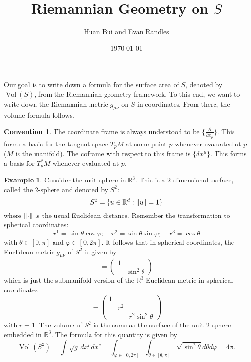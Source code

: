 \documentclass{article}
\author{Huan Bui and Evan Randles}
\title{Riemannian Geometry on $S$}
\date{\today}
\theoremstyle{definition}
\newtheorem{exmp}{Example}[section]
\newcommand{\p}{\partial}
\newcommand{\R}{\mathbb{R}}
\newcommand{\f}[2]{\frac{#1}{#2}}
\theoremstyle{theorem}
\newtheorem{convention}[theorem]{Convention}
\newcommand{\Vol}{\operatorname{Vol}}
\begin{document}
\maketitle

Our goal is to write down a formula for the surface area of $S$, denoted by $\Vol(S)$, from the Riemannian geometry framework. To this end, we want to write down the Riemannian metric $g_{\mu\nu}$ on $S$ in coordinates. From there, the volume formula follows. 



\begin{convention}
The coordinate frame is always understood to be $\{ \f{\p}{\p x_\mu} \}$. This forms a basis for the tangent space $T_pM$ at some point $p$ whenever evaluated at $p$ ($M$ is the manifold). The coframe with respect to this frame is $\{ dx^\mu \}$. This forms a basis for $T_p^*M$ whenever evaluated at $p$. 
\end{convention}











\begin{exmp}
Consider the unit sphere in $\R^3$. This is a 2-dimensional surface, called the 2-sphere and denoted by $S^2$:
\begin{equation*}
    S^2 = \{ u\in \R^d : \norm{u} = 1 \}
\end{equation*}
where $\norm{\cdot}$ is the usual Euclidean distance. Remember the transformation to spherical coordinates:
\begin{equation}
    x^1 = \sin \theta \cos\varphi; \quad x^2 = \sin\theta\sin\varphi; \quad x^3 = \cos\theta
\end{equation}
with $\theta \in [0,\pi]$ and $\varphi \in [0,2\pi]$. It follows that in spherical coordinates, the Euclidean metric $g_{\mu\nu}$ of $S^2$ is given by
\begin{equation}
    [g_{\mu\nu}] = \begin{pmatrix} 
    1 &  \\  & \sin^2\theta
    \end{pmatrix}
\end{equation}
which is just the submanifold version of the $\R^3$ Euclidean metric in spherical coordinates
\begin{equation*}
    [g_{\mu\nu}] = 
    \begin{pmatrix}
    1 & & \\ & r^2 & \\ & & r^2\sin^2\theta
    \end{pmatrix}
\end{equation*}
with $r=1$. The volume of $S^2$ is the same as the surface of the unit 2-sphere embedded in $\R^3$. The formula for this quantity is given by 
\begin{equation*}
    \Vol(S^2) = \int \sqrt{g} \,dx^\mu dx^\nu = \int_{\varphi\in [0,2\pi]}\int_{\theta\in [0,\pi]} \sqrt{\sin^2\theta} \, d\theta d\varphi = 4\pi.
\end{equation*}
\end{exmp}
\end{document}
